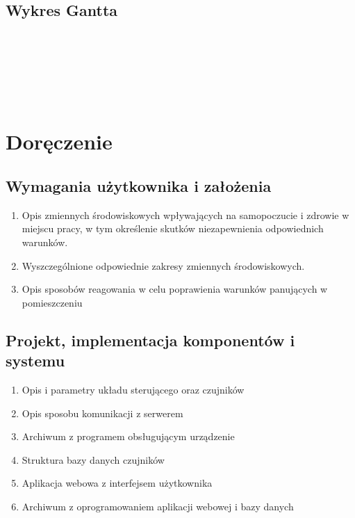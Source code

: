 \documentclass[10pt, a4paper]{article}
\begin{document}
\subsection{Wykres Gantta}


\hspace{-60px}
\begin{ganttchart}{1}{33}
 \\
 \\
 \\
 \\
 \\
\end{ganttchart}


\section{Doręczenie}

\subsection{Wymagania użytkownika i założenia}
	\begin{enumerate}
	\item Opis zmiennych środowiskowych wpływających na samopoczucie i zdrowie w miejscu pracy, w tym określenie skutków niezapewnienia odpowiednich warunków.
	\item Wyszczególnione odpowiednie zakresy zmiennych środowiskowych.
	\item Opis sposobów reagowania w celu poprawienia warunków panujących w pomieszczeniu
	\end{enumerate}
\subsection{Projekt, implementacja komponentów i systemu}
	\begin{enumerate}
	\item Opis i parametry układu sterującego oraz czujników
	\item Opis sposobu komunikacji z serwerem
	\item Archiwum z programem obsługującym urządzenie
	\item Struktura bazy danych czujników
	\item Aplikacja webowa z interfejsem użytkownika
	\item Archiwum z oprogramowaniem aplikacji webowej i bazy danych
	\end{enumerate}
\end{document}
